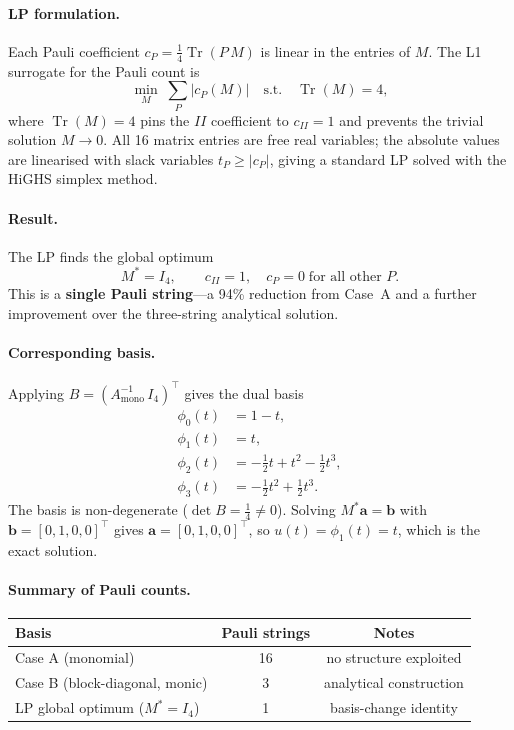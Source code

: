 \documentclass{article}
\begin{document}
\paragraph{LP formulation.}
Each Pauli coefficient $c_P = \tfrac{1}{4}\operatorname{Tr}(P\,M)$ is linear in the
entries of $M$.  The L1 surrogate for the Pauli count is
\begin{equation}
    \min_{M}\;\sum_{P}|c_P(M)|
    \quad\text{s.t.}\quad \operatorname{Tr}(M) = 4,
\end{equation}
where $\operatorname{Tr}(M)=4$ pins the $II$ coefficient to $c_{II}=1$ and
prevents the trivial solution $M\to 0$.  All 16 matrix entries are free real
variables; the absolute values are linearised with slack variables $t_P\geq|c_P|$,
giving a standard LP solved with the HiGHS simplex method.

\paragraph{Result.}
The LP finds the global optimum
\begin{equation}
    M^* = I_4,
    \qquad
    c_{II} = 1, \quad c_P = 0 \;\text{for all other } P.
\end{equation}
This is a \textbf{single Pauli string}---a 94\% reduction from Case~A and a
further improvement over the three-string analytical solution.

\paragraph{Corresponding basis.}
Applying $B = (A_{\mathrm{mono}}^{-1}\,I_4)^{\top}$ gives the dual basis
\begin{align*}
    \phi_0(t) &= 1 - t, \\
    \phi_1(t) &= t, \\
    \phi_2(t) &= -\tfrac{1}{2}t + t^2 - \tfrac{1}{2}t^3, \\
    \phi_3(t) &= -\tfrac{1}{2}t^2 + \tfrac{1}{2}t^3.
\end{align*}
The basis is non-degenerate ($\det B = \tfrac{1}{4}\neq 0$).  Solving
$M^*\mathbf{a}=\mathbf{b}$ with $\mathbf{b}=[0,1,0,0]^{\top}$ gives
$\mathbf{a}=[0,1,0,0]^{\top}$, so $u(t)=\phi_1(t)=t$, which is the exact solution.

\paragraph{Summary of Pauli counts.}
\begin{center}
\begin{tabular}{lcc}
\hline
Basis & Pauli strings & Notes \\
\hline
Case A (monomial)              & 16 & no structure exploited \\
Case B (block-diagonal, monic) &  3 & analytical construction \\
LP global optimum ($M^*=I_4$)  &  1 & basis-change identity \\
\hline
\end{tabular}
\end{center}
\end{document}
